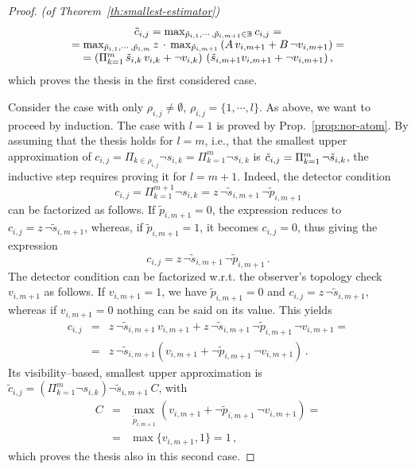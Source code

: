 \begin{proof}{\em (of Theorem~\ref{th:smallest-estimator})}
\begin{equation*}
\begin{array}{c}
\tilde{c}_{i,j} = \max_{\tilde{p}_{i,1}, \cdots, \tilde{p}_{i,m+1} \in \Bbb{B}} c_{i,j} =\\
= \max_{\tilde{p}_{i,1}, \cdots, \tilde{p}_{i,m}} z \, \cdot \, \max_{\tilde{p}_{i,m+1}} \left( A \, v_{i,m+1} + B \, \neg v_{i,m+1} \right) = \\
= \left( \Pi_{k=1}^{m} \, \tilde{s}_{i,k} \, v_{i,k} + \neg v_{i,k} \right) \, \left( \tilde{s}_{i,m+1} v_{i,m+1} + \neg v_{i,m+1} \right) ,
\end{array}
\end{equation*}
which proves the thesis in the first considered case.

Consider the case with only $\rho_{i,j} \neq \emptyset$, $\rho_{i,j}=\{1, \cdots, l\}$. As above, we want to proceed by induction. The case with $l=1$ is proved by Prop.~\ref{prop:nor-atom}. By assuming that the thesis holds for $l=m$, i.e., that the smallest upper approximation of $c_{i,j} = \Pi_{k \in \rho_{i,j}} \neg s_{i,k} = \Pi_{k=1}^{m} \neg s_{i,k}$ is $\tilde{c}_{i,j} = \Pi_{k=1}^{m} \, \neg \tilde{s}_{i,k}$, the inductive step requires proving it for $l=m+1$. Indeed, the detector condition 
$$
c_{i,j}=\Pi_{k=1}^{m+1} \neg s_{i,k} = z \, \neg \tilde{s}_{i,m+1} \, \neg \tilde{p}_{i,m+1}
$$
can be factorized as follows. If $\tilde{p}_{i,m+1} = 0$, the expression reduces to $c_{i,j} = z \, \neg \tilde{s}_{i,m+1}$, whereas, if $\tilde{p}_{i,m+1} = 1$, it becomes $c_{i,j}=0$, thus giving the expression
\begin{equation*}
c_{i,j} = z \, \neg \tilde{s}_{i,m+1} \, \neg \tilde{p}_{i,m+1} \, .
\end{equation*}
The detector condition can be factorized w.r.t. the observer's topology check $v_{i,m+1}$ as follows. If $v_{i,m+1} = 1$, we have $\tilde{p}_{i,m+1} = 0$ and $c_{i,j} = z \, \neg \tilde{s}_{i,m+1}$, whereas if $v_{i,m+1} = 0$ nothing can be said on its value. This yields
\begin{equation*}
\begin{array}{rcl}
c_{i,j} & = & z \, \neg \tilde{s}_{i,m+1} \, v_{i,m+1} + z \, \neg \tilde{s}_{i,m+1} \, \neg \tilde{p}_{i,m+1} \, \neg v_{i,m+1} = \\
& = & z \, \neg \tilde{s}_{i,m+1} \left( v_{i,m+1} + \neg \tilde{p}_{i,m+1} \, \neg v_{i,m+1} \right)
 \, .
 \end{array}
\end{equation*}
Its visibility--based, smallest upper approximation is ${\tilde{c}_{i,j} = \left( \Pi_{k=1}^m \neg s_{i,k} %
\right) \neg \tilde{s}_{i,m+1} \, C}$, with 
$$
\begin{array}{rcl}
C & = & \max_{\tilde{p}_{i,m+1}} \left( v_{i,m+1} + \neg \tilde{p}_{i,m+1} \, \neg v_{i,m+1} \right) = \\
& = & \max \{v_{i,m+1}, 1\} = 1 \, ,
\end{array}
$$
which proves the thesis also in this second case.


\end{proof}
